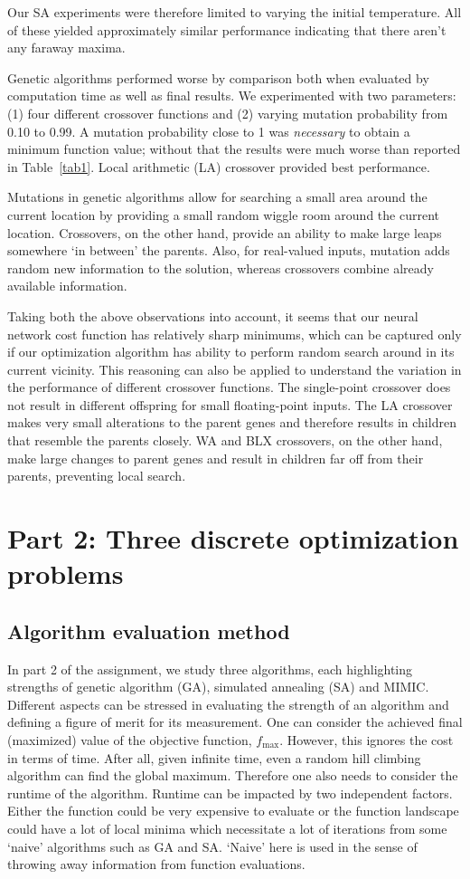 \documentclass[10pt,letterpaper]{article}
\begin{document}
Our SA experiments were therefore limited to varying the initial temperature. All of these yielded approximately similar performance indicating that there aren't any faraway maxima. 

Genetic algorithms performed worse by comparison both when evaluated by computation time as well as final results. We experimented with two parameters: (1) four different crossover functions and (2) varying mutation probability from 0.10 to 0.99. A mutation probability close to 1 was {\em necessary} to obtain a minimum function value; without that the results were much worse than reported in Table~\ref{tab1}. Local arithmetic (LA) crossover provided best performance.

Mutations in genetic algorithms allow for searching a small area around the current location by providing a small random wiggle room around the current location. Crossovers, on the other hand, provide an ability to make large leaps  somewhere `in between' the parents. Also, for real-valued inputs, mutation adds random new information to the solution, whereas crossovers combine already available information. 

Taking both the above observations into account, it seems that our neural network cost function has relatively sharp minimums, which can be captured only if our optimization algorithm has ability to perform random search around in its current vicinity. This reasoning can also be applied to understand the variation in the performance of different crossover functions. The single-point crossover does not result in different offspring for small floating-point inputs. The LA crossover makes very small alterations to the parent genes and therefore results in children that resemble the parents closely. WA and BLX crossovers, on the other hand, make large changes to parent genes and result in children far off from their parents, preventing  local search. 

\section{Part 2: Three discrete optimization problems}
\subsection{Algorithm evaluation method}
In part 2 of the assignment, we study three algorithms, each highlighting strengths of genetic algorithm (GA), simulated annealing (SA) and MIMIC. Different aspects can be stressed in evaluating the strength of an algorithm and defining a figure of merit for its measurement. One can consider the achieved final (maximized) value of the objective function, $f_{\text{max}}$. However, this ignores the cost in terms of time. After all, given infinite time, even a random hill climbing algorithm can find the global maximum. Therefore one also needs to consider the runtime of the algorithm. Runtime can be impacted by two independent factors. Either the function could be very expensive to evaluate or the function landscape could have a lot of local minima which necessitate a lot of iterations from some `naive' algorithms such as GA and SA. `Naive' here is used in the sense of throwing away information from function evaluations. 
\end{document}
